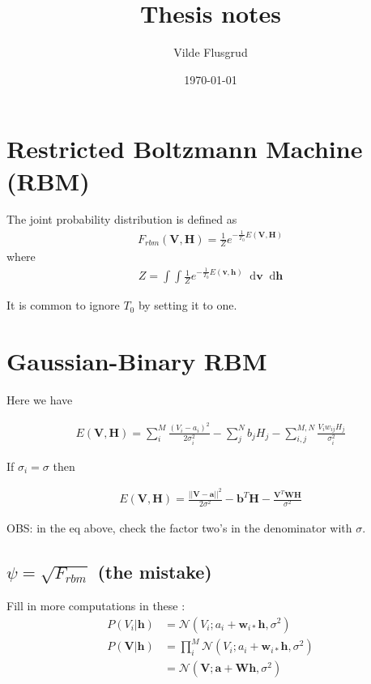 \documentclass[norsk,a4paper,11pt]{article}
\title{Thesis notes}
\author{Vilde Flusgrud}
\newcommand*\diff{\mathop{}\!\mathrm{d}}
\begin{document}
\date{\today}
\maketitle


\section{Restricted Boltzmann Machine (RBM)}



The joint probability distribution is defined as \cite{gausbinRBM}
\begin{align}
	F_{rbm}(\mathbf{V},\mathbf{H}) = \frac{1}{Z} e^{-\frac{1}{T_0}E(\mathbf{V},\mathbf{H})}
\end{align}
where
\begin{align}
	Z = \int \int \frac{1}{Z} e^{-\frac{1}{T_0}E(\mathbf{v},\mathbf{h})} \diff \mathbf{v} \diff \mathbf{h}
\end{align}

It is common to ignore $T_0$ by setting it to one.

\section{Gaussian-Binary RBM}
Here we have \cite{gausbinRBM}

\begin{align}
	E(\mathbf{V}, \mathbf{H}) = \sum_i^M \frac{(V_i - a_i)^2}{2\sigma_i^2} - \sum_j^N b_j H_j - \sum_{i,j}^{M,N} \frac{V_i w_{ij} H_j}{\sigma_i^2} 
\end{align}

If $\sigma_i = \sigma$ then

\begin{align}
	E(\mathbf{V}, \mathbf{H})= \frac{||\mathbf{V} - \mathbf{a}||^2}{2\sigma^2} - \mathbf{b}^T \mathbf{H} - \frac{\mathbf{V}^T \mathbf{W} \mathbf{H}}{\sigma^2}
\end{align}

OBS: in the eq above, check the factor two's in the denominator with $\sigma$.

\color{Green}
\subsection{$\psi = \sqrt{F_{rbm}}$ (the mistake)}
\color{Black}

Fill in more computations in these \cite{gausbinRBM}:
\begin{align}
	P(V_i|\mathbf{h}) &= \mathcal{N}(V_i; a_i+\mathbf{w}_{i*} \mathbf{h}, \sigma^2) \\
	P(\mathbf{V}|\mathbf{h}) &= \prod_i^M \mathcal{N}(V_i; a_i+\mathbf{w}_{i*} \mathbf{h}, \sigma^2) \\
	&= \mathcal{N} (\mathbf{V}; \mathbf{a}+\mathbf{W}\mathbf{h},\sigma^2)
\end{align}
\end{document}
